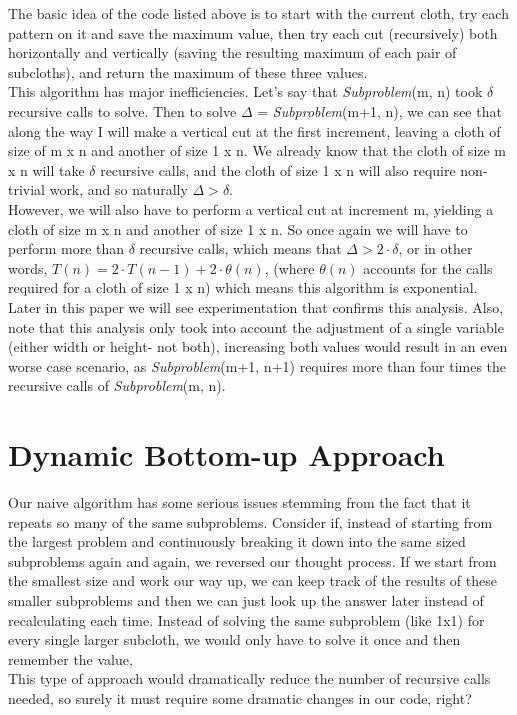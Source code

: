 \documentclass[paper=a4, fontsize=11pt]{scrartcl} %
\numberwithin{equation}{section} %
\numberwithin{figure}{section} %
\numberwithin{table}{section} %
\begin{document}
The basic idea of the code listed above is to start with the current cloth, try each pattern on it and save the maximum value, then try each cut (recursively) both horizontally and vertically (saving the resulting maximum of each pair of subcloths), and return the maximum of these three values.\\
\indent This algorithm has major inefficiencies. Let's say that \emph{Subproblem}(m, n) took $\delta$ recursive calls to solve. Then to solve $\Delta$ = \emph{Subproblem}(m+1, n), we can see that along the way I will make a vertical cut at the first increment, leaving a cloth of size of m x n and another of size 1 x n. We already know that the cloth of size m x n will take $\delta$ recursive calls, and the cloth of size 1 x n will also require non-trivial work, and so naturally $\Delta > \delta$.\\
\indent However, we will also have to perform a vertical cut at increment m, yielding a cloth of size m x n and another of size 1 x n. So once again we will have to perform more than $\delta$ recursive calls, which means that $\Delta > 2 \cdot \delta$, or in other words, $T(n) = 2 \cdot T(n-1) + 2 \cdot \theta(n)$, (where $\theta(n)$ accounts for the calls required for a cloth of size 1 x n) which means this algorithm is exponential. \\
\indent Later in this paper we will see experimentation that confirms this analysis. Also, note that this analysis only took into account the adjustment of a single variable (either width or height- not both), increasing both values would result in an even worse case scenario, as \emph{Subproblem}(m+1, n+1) requires more than four times the recursive calls of \emph{Subproblem}(m, n).

\section{Dynamic Bottom-up Approach}

Our naive algorithm has some serious issues stemming from the fact that it repeats so many of the same subproblems. Consider if, instead of starting from the largest problem and continuously breaking it down into the same sized subproblems again and again, we reversed our thought process. If we start from the smallest size and work our way up, we can keep track of the results of these smaller subproblems and then we can just look up the answer later instead of recalculating each time. Instead of solving the same subproblem (like 1x1) for every single larger subcloth, we would only have to solve it once and then remember the value, \\
\indent This type of approach would dramatically reduce the number of recursive calls needed, so surely it must require some dramatic changes in our code, right?
\end{document}
